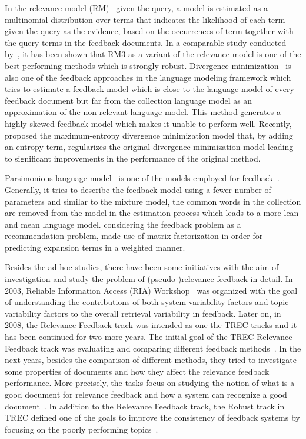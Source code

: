 In the relevance model (RM)~\citep{Abdul-jaleel:2004,Lavrenko:2001} given the query, a model is estimated as a multinomial distribution over terms that indicates the likelihood of each term given the query as the evidence, based on the occurrences of term together with the query terms in the feedback documents.  In a comparable study conducted by~\citet{Zhai:SMM:2001}, it has been shown that RM3 as a variant of the relevance model is one of the best performing methods which is strongly robust.
Divergence minimization~\citep{Zhai:SMM:2001} is also one of the feedback approaches in the language modeling framework which tries to estimate a feedback model which is close to the language model of every feedback document but far from the collection language model as an approximation of the non-relevant language model. This method generates a highly skewed feedback model which makes it unable to perform well. Recently, \citet{Lv:2014} proposed the maximum-entropy divergence minimization model that, by adding an entropy term, regularizes the original divergence minimization model leading to significant improvements in the performance of the original method.

Parsimonious language model~\citep{Hiemstra:2004} is one of the models employed for feedback~\citep{Meij:2008,Hiemstra:2008:TREC,Kaptein:2008:TREC}. Generally, it tries to describe the feedback model using a fewer number of parameters and similar to the mixture model, the common words in the collection are removed from the model in the estimation process which leads to a more lean and mean language model.  \citet{Zamani:2016a} considering the feedback problem as a recommendation problem, made use of matrix factorization in order for predicting expansion terms in a weighted manner.

Besides the ad hoc studies, there have been some initiatives with the aim of investigation and study the problem of (pseudo-)relevance feedback in detail. In 2003, Reliable Information Access (RIA) Workshop~\citep{Harman:2009,Warren:2004} 
was organized with the goal of understanding the contributions of both system variability factors and topic variability factors to the overall retrieval variability in feedback. 
Later on, in 2008, the Relevance Feedback track was intended as one the TREC tracks and it has been continued for two more years. The initial goal of the TREC Relevance Feedback track was evaluating and comparing different feedback methods~\citep{Buckley:2008:TREC}. In the next years, besides the comparison of different methods, they tried to investigate some properties of documents and how they affect the relevance feedback performance. More precisely, the tasks focus on studying the notion of what is a good document for relevance feedback and how a system can recognize a good document~\citep{Buckley:2010:TREC}. 
In addition to the Relevance Feedback track, the Robust track in TREC defined one of the goals to improve the consistency of feedback systems by focusing on the poorly performing topics~\citep{Voorhees:2003:TREC}.

